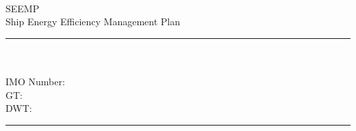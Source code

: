 
\newcommand{\HRule}{\textcolor{greenheavy}{\rule{0.5\linewidth}{0.25mm}}}

\pagestyle{empty}

\begin{titlepage}
~\\
\vspace{4cm}
\begin{center}
\textcolor{greenheavy}{
\Huge{
SEEMP %
}\\
Ship Energy Efficiency Management Plan
}

\vspace{4cm}
\HRule
\textcolor{greenheavy}{
\LARGE{
\\
\\
IMO Number: %
\\
GT: %
\\
DWT: %
\\
}
}
\HRule
\end{center}
\vfill
\noindent
\begin{minipage}{0.4\textwidth}
\begin{flushleft}
\large{
}
\end{flushleft}
\end{minipage}
\begin{minipage}{0.5\textwidth}
\begin{flushright}
\large{

}
\end{flushright}
\end{minipage}
\end{titlepage}
